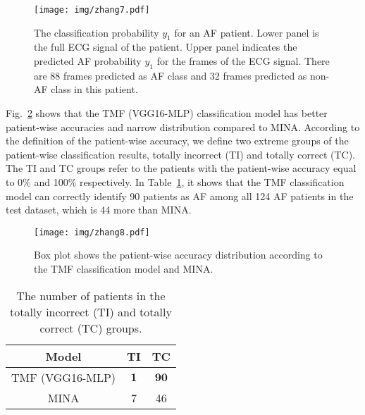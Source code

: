 \documentclass[journal]{IEEEtran}
\begin{document}
\begin{figure}[ht]
  \centering
  \texttt{[image: img/zhang7.pdf]}
  \caption{The classification probability ${y}_1$ for an AF patient. Lower panel is the full ECG signal of the patient. Upper panel indicates the predicted AF probability ${y}_1$ for the frames of the ECG signal. There are 88 frames predicted as AF class and 32 frames predicted as non-AF class in this patient. }
  \label{fig:patient-segment}
\end{figure}


Fig.~\ref{fig:patient-box-plot} shows that the TMF (VGG16-MLP) classification model has better patient-wise accuracies and narrow distribution compared to MINA. According to the definition of the patient-wise accuracy, we define two extreme groups of the patient-wise classification results, totally incorrect (TI) and totally correct (TC). The TI and TC groups refer to the patients with the patient-wise accuracy equal to 0\% and 100\% respectively. In Table~\ref{tab:result-patient-classifier}, it shows that the TMF classification model can correctly identify 90 patients as AF among all 124 AF patients in the test dataset, which is 44 more than MINA.

\begin{figure}[H]
  \centering
  \texttt{[image: img/zhang8.pdf]}
  \caption{Box plot shows the patient-wise accuracy distribution according to the TMF classification model and MINA.}
  \label{fig:patient-box-plot}
\end{figure}

\begin{table}[H]
  \caption{The number of patients in the totally incorrect (TI) and totally correct (TC) groups.}
  \centering
  \begin{tabular}{ccc}
  \hline
  Model     &   TI & TC\\
  \hline
  TMF (VGG16-MLP) &  $\mathbf{1}$ &   $\mathbf{90}$\\
  MINA        &  7 &   46\\
  \hline
  \end{tabular}
  \label{tab:result-patient-classifier}
\end{table}
\end{document}
